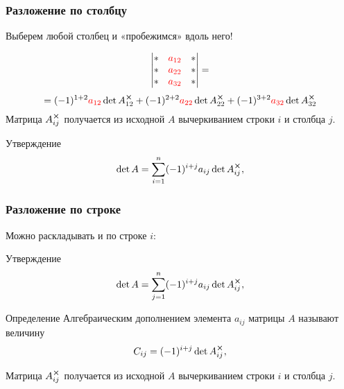 \begin{frame}
    \frametitle{Разложение по столбцу}

    Выберем любой столбец и «пробежимся» вдоль него!

    \[
        \begin{vmatrix}
            * & \textcolor{red}{a_{12}} & * \\
            * & \textcolor{red}{a_{22}} & * \\
            * & \textcolor{red}{a_{32}} & * \\
        \end{vmatrix}  =      
    \]
    \[ 
       =(-1)^{1+2} \textcolor{red}{a_{12}} \det A_{12}^{\cross} +
        (-1)^{2+2} \textcolor{red}{a_{22}} \det A_{22}^{\cross} +
        (-1)^{3+2} \textcolor{red}{a_{32}} \det A_{32}^{\cross}
    \]
    Матрица $A_{ij}^{\cross}$ получается из исходной $A$ вычеркиванием строки $i$ и
    столбца $j$.
    \pause
    \begin{block}{Утверждение}       
    \[
    \det A = \sum_{i=1}^{n} (-1)^{i+j} a_{ij} \det A_{ij}^{\cross},
    \]
    \end{block}

    
\end{frame}


\begin{frame}
    \frametitle{Разложение по строке}

    Можно раскладывать и по строке $i$:
\begin{block}{Утверждение}
\[
\det A = \sum_{j=1}^{n} (-1)^{i+j} a_{ij} \det A_{ij}^{\cross},
\]
\end{block}

    \begin{block}{Определение}
        \alert{Алгебраическим дополнением} элемента $a_{ij}$ матрицы $A$ называют величину
        \[
         C_{ij} = (-1)^{i+j} \det A_{ij}^{\cross},    
        \]
    \end{block}

    Матрица $A_{ij}^{\cross}$ получается из исходной $A$ вычеркиванием строки $i$ и
    столбца $j$.

\end{frame}